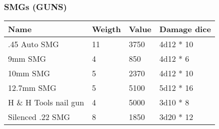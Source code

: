 
\subsubsection{SMGs (GUNS)}
\begin{longtable}{|p{4cm}|p{1.5cm}|p{1.5cm}|p{9cm}|}
\hline
\bfseries Name & \bfseries Weigth & \bfseries Value & \bfseries Damage dice \\
\hline
\endhead
.45 Auto SMG  & 11 & 3750 & 4d12 * 10 \\
9mm SMG  & 4 & 850 & 4d12 *  6 \\
10mm SMG  & 5 & 2370 & 4d12 *  10 \\
12.7mm SMG & 5 & 5100 & 5d12 *  16 \\
H \& H Tools nail gun  & 4 & 5000 & 3d10 * 8 \\
Silenced .22 SMG  & 8 & 1850 & 3d20 * 12 \\
\hline
\end{longtable}

